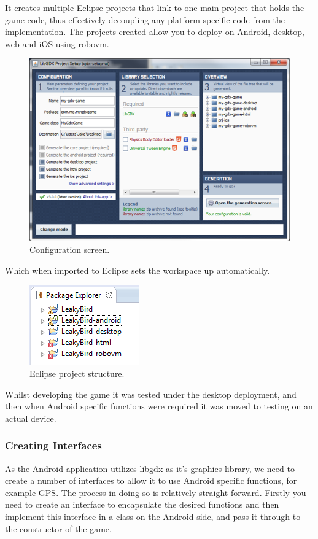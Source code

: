 It creates multiple Eclipse projects that link to one main project that holds the game code, thus effectively decoupling any platform specific code from the implementation. The projects created allow you to deploy on Android, desktop, web and iOS using robovm.
\clearpage
\begin{figure}[h!]
\centering\includegraphics[width=\linewidth]{implementation/figures/gdx-setup-2.png}
\caption{Configuration screen.}
\end{figure}

Which when imported to Eclipse sets the workspace up automatically.

\begin{figure}[h!]
\centering\includegraphics{implementation/figures/gdx-setup-3.png}
\caption{Eclipse project structure.}
\end{figure}
\clearpage
Whilst developing the game it was tested under the desktop deployment, and then when Android specific functions were required it was moved to testing on an actual device.

\subsubsection{Creating Interfaces}
As the Android application utilizes libgdx as it’s graphics library, we need to create a number of interfaces to allow it to use Android specific functions, for example GPS. The process in doing so is relatively straight forward. Firstly you need to create an interface to encapsulate the desired functions and then implement this interface in a class on the Android  side, and pass it through to the constructor of the game. 

